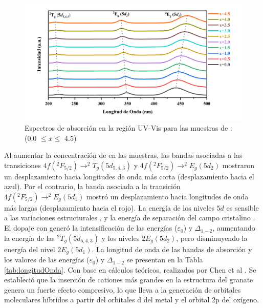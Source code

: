 \begin{figure}[H]
    \centering%

    \includegraphics[width=\textwidth]{Kap4/Absorcion.png}%
    \caption{Espectros de absorción en la región UV-Vis para las muestras de
    : (0.0 $\leq x \leq$
    4.5)}\label{fig:abso}
\end{figure}

Al aumentar la concentración de  en las muestras, las bandas
asociadas a
las transiciones $4f(^2F_{5/2}) \rightarrow ^2T_g (5d_{5,4,3})$ y
$4f(^2F_{5/2}) \rightarrow ^2E_g (5d_2)$ mostraron
un desplazamiento hacia longitudes de onda más corta (desplazamiento hacia el
azul). Por el contrario, la banda asociada a la transición $4f(^2F_{5/2})
    \rightarrow ^2E_g(5d_1)$ mostró un desplazamiento hacia longitudes de onda
más
largas
(desplazamiento hacia el rojo). La energía de los niveles $5d$ es sensible
a
las variaciones estructurales \cite{Xu2014}, y la energía de separación del
campo
cristalino \cite{Dorenbos2003}. El dopaje con  generó la
intensificación de las
energías
($\varepsilon_{0}$) y $\Delta_{1-2}$, aumentando la energía de las
$^2T_g(5d_{5,4,3})$ y los niveles $2E_g(5d_2)$,
pero disminuyendo la energía del nivel $2E_g(5d_1)$. La longitud de onda de las
bandas de absorción y los valores de las energías ($\varepsilon_{0}$) y
$\Delta_{1-2}$ se presentan en la
Tabla \ref{tab:longitudOnda}. Con base en cálculos teóricos, realizados por
Chen et al
\cite{Chen2015a}. Se
estableció que la inserción de cationes más grandes en la estructura del
granate genera un fuerte efecto compresivo, lo que lleva a la generación de
orbitales moleculares híbridos a partir del orbitales d del metal y el orbital
2p del oxígeno.\\

